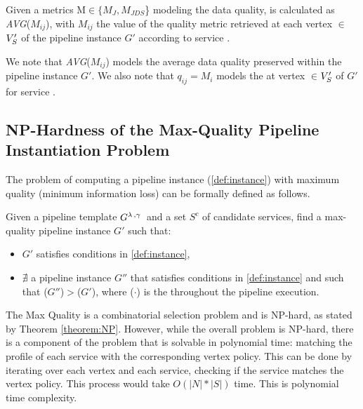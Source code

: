 \begin{definition}[\emph{\quality}]
  Given a metrics M$\in$$\{M_J,M_{JDS}$\} modeling the data quality, \quality is calculated as \emph{AVG}($M_{ij}$), with $M_{ij}$ the value of the quality metric retrieved at each vertex $\in$$V'_S$ of the pipeline instance $G'$ according to service .
\end{definition}

We note that \emph{AVG}($M_{ij}$) models the average data quality preserved within the pipeline instance $G'$.
We also note that $q_{ij}$$=$$M_i$ models the \quality at vertex $\in$$V'_S$ of $G'$ for service .

\subsection{NP-Hardness of the Max-Quality Pipeline Instantiation Problem}\label{sec:nphard}
The problem of computing a pipeline instance (\cref{def:instance}) with maximum quality (minimum information loss) can be formally defined as follows.

\begin{definition}\label{def:MaXQualityInstance}
  Given a pipeline template $G^{\lambda\,,\gamma\,}$ and a set $S^c$ of candidate services, find a max-quality pipeline instance $G'$ such that:
  \begin{itemize}
    \item $G'$ satisfies conditions in \cref{def:instance},
    \item $\nexists$ a pipeline instance $G''$ that satisfies conditions in \cref{def:instance} and such that \quality \textit{\q}($G''$)$>$\textit{\q}($G'$), where \textit{\q}($\cdot$) is the \quality throughout the pipeline execution.
  \end{itemize}
\end{definition}

The Max Quality \problem is a combinatorial selection problem and is NP-hard, as stated by Theorem \cref{theorem:NP}. However, while the overall problem is NP-hard, there is a component of the problem that is solvable in polynomial time: matching the profile of each service with the corresponding vertex policy. This can be done by iterating over each vertex and each service, checking if the service matches the vertex policy. This process would take $O(|N|*|S|)$ time. This is polynomial time complexity.

